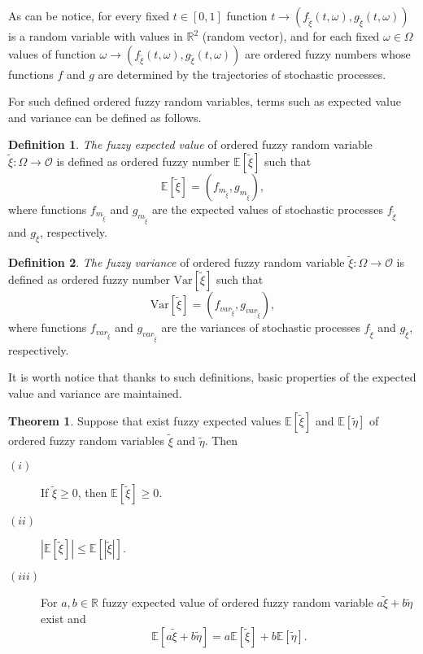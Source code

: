 \documentclass[review]{elsarticle}
\theoremstyle{definition}
\newtheorem{definition}{Definition}[section]
\theoremstyle{theorem}
\newtheorem{theorem}{Theorem}[section]
\begin{document}
As can be notice, for every fixed $ t \in [0,1] $ function $ t \to \left(f_{\tilde{\xi}} (t, \omega), g_{\tilde{\xi}} (t, \omega) \right) $ is a random variable with values in $ \mathbb{R}^2 $ (random vector), and for each fixed $ \omega \in \Omega $ values of function $ \omega \to \left(f_{\tilde {\xi}} (t, \omega), g_{\tilde{\xi}} (t, \omega) \right) $ are ordered fuzzy numbers whose functions $f$ and $g$ are determined by the trajectories of stochastic processes.

For such defined ordered fuzzy random variables, terms such as expected value and variance can be defined as follows.

\begin{definition}
{\it The fuzzy expected value} of ordered fuzzy random variable $\tilde{\xi}\colon\Omega\to\mathcal{O}$ is defined as ordered fuzzy number $\mathbb{E}[\tilde{\xi}]$ such that
\begin{equation}
\mathbb{E}[\tilde{\xi}]=\left(f_{m_{\tilde{\xi}}}, g_{m_{\tilde{\xi}}} \right),
\end{equation} 
where functions $f_{m_{\tilde{\xi}}}$ and $g_{m_{\tilde{\xi}}}$ are the expected values of stochastic processes $f_{\tilde{\xi}}$ and $g_{\tilde{\xi}}$, respectively.
\end{definition}

\begin{definition}
{\it The fuzzy variance} of ordered fuzzy random variable $\tilde{\xi}\colon\Omega\to\mathcal{O}$ is defined as ordered fuzzy number $\mathrm{Var}[\tilde{\xi}]$ such that
\begin{equation}
\mathrm{Var}[\tilde{\xi}]=\left(f_{var_{\tilde{\xi}}}, g_{var_{\tilde{\xi}}} \right),
\end{equation}
where functions $f_{var_{\tilde{\xi}}}$ and $g_{var_{\tilde{\xi}}}$ are the variances of stochastic processes $f_{\tilde{\xi}}$ and $g_{\tilde{\xi}}$, respectively.
\end{definition}

It is worth notice that thanks to such definitions, basic properties of the expected value and variance are maintained.

\begin{theorem}
Suppose that exist fuzzy expected values $ \mathbb{E}[\tilde{\xi}] $ and $ \mathbb{E}[\tilde{\eta}]$ of ordered fuzzy random variables $ \tilde{\xi}$ and $ \tilde{\eta} $. Then
\begin{description}
\item[$(i)$] If $\tilde{\xi}\geq 0$, then $\mathbb{E}[\tilde{\xi}]\geq 0$.
\item[$(ii)$] $|\mathbb{E}[\tilde{\xi}]|\leq \mathbb{E}[|\tilde{\xi}|]$.
\item[$(iii)$] For $a,b\in\mathbb{R}$ fuzzy expected value of ordered fuzzy random variable $a\tilde{\xi}+b\tilde{\eta}$ exist and
$$\mathbb{E}[a\tilde{\xi}+b\tilde{\eta}]=a\mathbb{E}[\tilde{\xi}]+b\mathbb{E}[\tilde{\eta}].$$
\end{description}
\end{theorem}
\end{document}
